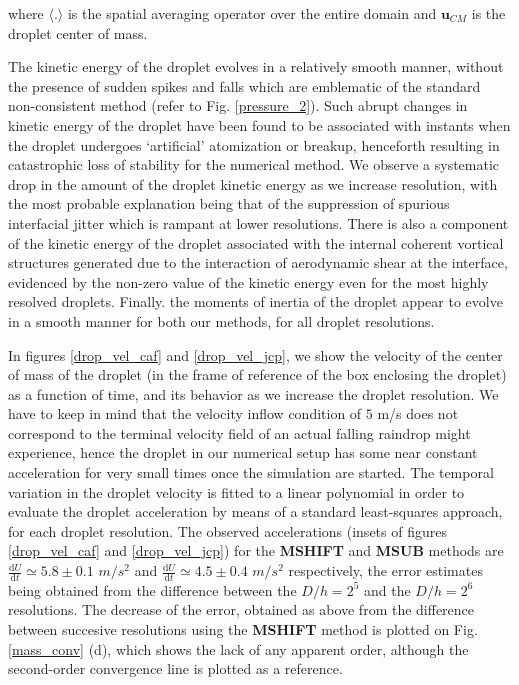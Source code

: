 where $ \langle . \rangle$ is the spatial averaging operator over the  
entire domain and $\boldsymbol{u}_{CM}$ is the droplet center of mass.


The kinetic energy of the droplet evolves in a relatively smooth manner, 
without the presence of sudden spikes and falls which are emblematic of 
the standard non-consistent method (refer to Fig. \ref{pressure_2}). 
Such abrupt changes in kinetic energy of the droplet have been 
found to be associated with instants when the droplet undergoes 
`artificial' atomization or breakup, henceforth resulting in 
catastrophic loss of stability for the numerical method. 
We observe a systematic drop in the amount of the droplet 
kinetic energy as we increase resolution, with the most probable explanation 
being that of the suppression of spurious interfacial 
jitter which is rampant at lower resolutions. 
There is also a component of the kinetic energy of the droplet 
associated with the internal coherent vortical structures generated due to 
the interaction of aerodynamic shear at the interface, 
evidenced by the non-zero value of the kinetic 
energy even for the most highly resolved droplets. 
Finally. the moments of inertia of the droplet appear to evolve in a smooth manner 
for both our methods, for all droplet resolutions.

In figures \ref{drop_vel_caf} and \ref{drop_vel_jcp}, 
we show the velocity of the center of mass of the droplet 
(in the frame of reference of the box enclosing the droplet) 
as a function of time, and its behavior as we increase the droplet resolution. 
We have to keep in mind that the velocity inflow condition 
of $5$ m/s does not correspond to the terminal velocity 
field of an actual falling raindrop might experience, 
hence the droplet in our numerical setup has some 
near constant acceleration for very small times once the simulation are started.
The temporal variation in the droplet velocity is fitted to a 
linear polynomial in order to evaluate the droplet acceleration 
by means of a standard least-squares approach, for each droplet resolution. 
The observed accelerations (insets of figures \ref{drop_vel_caf} and \ref{drop_vel_jcp})
for the \textbf{MSHIFT} and \textbf{MSUB} methods are 
$\frac{\textrm{d}U}{\textrm{d}t} \simeq 5.8 \pm 0.1$ $m/s^2$
and $\frac{\textrm{d}U}{\textrm{d}t} \simeq 4.5 \pm 0.4$ $m/s^2$
respectively, the error estimates being obtained from the difference
between the $D/h = 2^5$ and the $D/h = 2^6$ resolutions.
The decrease of the error, obtained as above from the
difference between succesive resolutions using the \textbf{MSHIFT} method 
is plotted on Fig. \ref{mass_conv} (d), which shows the lack of any apparent 
order, although the second-order convergence line is plotted as a reference.

